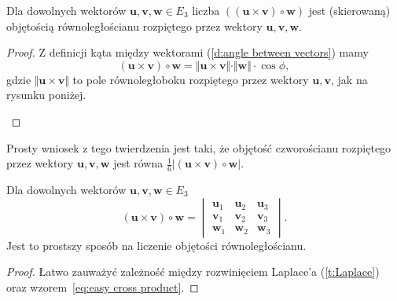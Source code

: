 \begin{theorem}
    \label{t:volume of parallelepiped}
    Dla dowolnych wektorów $\mathbf{u}, \mathbf{v}, \mathbf{w} \in E_3$ liczba $\left((\mathbf{u}\times\mathbf{v}) \circ \mathbf{w}\right)$ jest (skierowaną) objętością równoległościanu rozpiętego przez wektory $\mathbf{u}, \mathbf{v}, \mathbf{w}$.
\end{theorem}
\begin{proof}
    Z definicji kąta między wektorami (\ref{d:angle between vectors}) mamy
    \[ (\mathbf{u}\times\mathbf{v}) \circ \mathbf{w} = \Vert\mathbf{u}\times\mathbf{v}\Vert \cdot \Vert\mathbf{w}\Vert \cdot \cos\phi, \]
    gdzie $\Vert\mathbf{u}\times\mathbf{v}\Vert$ to pole równoległoboku rozpiętego przez wektory $\mathbf{u}, \mathbf{v}$, jak na rysunku poniżej.

    \begin{center}
    \end{center}
\end{proof}

Prosty wniosek z tego twierdzenia jest taki, że objętość czworościanu rozpiętego przez wektory $\mathbf{u}, \mathbf{v}, \mathbf{w}$ jest równa $\frac{1}{6}|(\mathbf{u}\times\mathbf{v}) \circ \mathbf{w}|$.

\begin{fact}
    \label{f:triple product}
    Dla dowolnych wektorów $\mathbf{u}, \mathbf{v}, \mathbf{w} \in E_3$
    \[ (\mathbf{u}\times\mathbf{v}) \circ \mathbf{w} = \begin{vmatrix}
        \mathbf{u}_1 & \mathbf{u}_2 & \mathbf{u}_3 \\
        \mathbf{v}_1 & \mathbf{v}_2 & \mathbf{v}_3 \\
        \mathbf{w}_1 & \mathbf{w}_2 & \mathbf{w}_3
    \end{vmatrix}. \]
    Jest to prostszy sposób na liczenie objętości równoległościanu.
\end{fact}
\begin{proof}
    Łatwo zauważyć zależność między rozwinięciem Laplace'a (\ref{t:Laplace}) oraz wzorem~\ref{eq:easy cross product}.
\end{proof}

